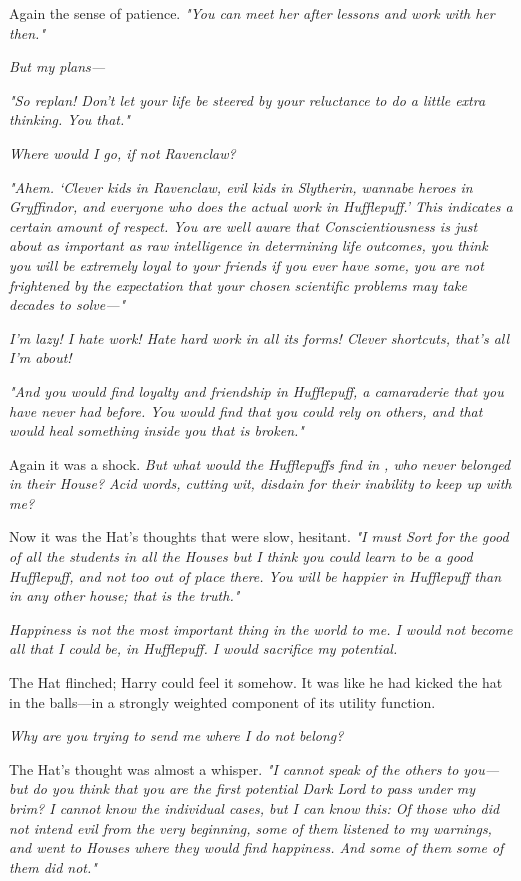 Again the sense of patience. \emph{"You can meet her after lessons and work
with her then."}

\emph{But my plans---}

\emph{"So replan! Don't let your life be steered by your reluctance to do a
little extra thinking. You  that."}

\emph{Where would I go, if not Ravenclaw?}

\emph{"Ahem. `Clever kids in Ravenclaw, evil kids in Slytherin, wannabe heroes
in Gryffindor, and everyone who does the actual work in Hufflepuff.' This
indicates a certain amount of respect. You are well aware that
Conscientiousness is just about as important as raw intelligence in determining
life outcomes, you think you will be extremely loyal to your friends if you
ever have some, you are not frightened by the expectation that your chosen
scientific problems may take decades to solve\mbox{---}"}

\emph{I'm lazy! I hate work! Hate hard work in all its forms! Clever shortcuts,
    that's all I'm about!}

\emph{"And you would find loyalty and friendship in Hufflepuff, a camaraderie
that you have never had before. You would find that you could rely on others,
    and that would heal something inside you that is broken."}

Again it was a shock. \emph{But what would the Hufflepuffs find in ,
    who never belonged in their House? Acid words, cutting wit, disdain for their
    inability to keep up with me?}

Now it was the Hat's thoughts that were slow, hesitant. \emph{"I must Sort for
the good of all the students in all the Houses{\el} but I think you could
learn to be a good Hufflepuff, and not too out of place there. You will be
happier in Hufflepuff than in any other house; that is the truth."}

\emph{Happiness is not the most important thing in the world to me. I would not
become all that I could be, in Hufflepuff. I would sacrifice my potential.}

The Hat flinched; Harry could feel it somehow. It was like he had kicked the
hat in the balls---in a strongly weighted component of its utility function.

\emph{Why are you trying to send me where I do not belong?}

The Hat's thought was almost a whisper. \emph{"I cannot speak of the others to
you---but do you think that you are the first potential Dark Lord to pass under
my brim? I cannot know the individual cases, but I can know this: Of those who
did not intend evil from the very beginning, some of them listened to my
warnings, and went to Houses where they would find happiness. And some of
them{\el} some of them did not."}

